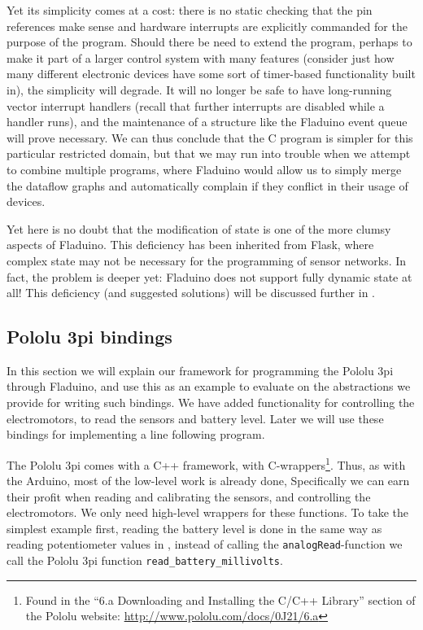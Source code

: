 \documentclass[a4paper, oneside, final]{memoir}
\let\fref\undefined
\let\Fref\undefined
\begin{document}
Yet its simplicity comes at a cost: there is no static checking that
the pin references make sense and hardware interrupts are explicitly
commanded for the purpose of the program.  Should there be need to
extend the program, perhaps to make it part of a larger control system
with many features (consider just how many different electronic
devices have some sort of timer-based functionality built in), the
simplicity will degrade.  It will no longer be safe to have
long-running vector interrupt handlers (recall that further interrupts
are disabled while a handler runs), and the maintenance of a structure
like the Fladuino event queue will prove necessary.  We can thus
conclude that the C program is simpler for this particular restricted
domain, but that we may run into trouble when we attempt to combine
multiple programs, where Fladuino would allow us to simply merge the
dataflow graphs and automatically complain if they conflict in their
usage of devices.

Yet here is no doubt that the modification of state is one of the more
clumsy aspects of Fladuino.  This deficiency has been inherited from
Flask, where complex state may not be necessary for the programming of
sensor networks.  In fact, the problem is deeper yet: Fladuino does
not support fully dynamic state at all!  This deficiency (and
suggested solutions) will be discussed further in
\Fref{chap:futurework}.

\subsection{Pololu 3pi bindings}
\label{sec:3pi bindings}
In this section we will explain our framework for programming the
Pololu 3pi through Fladuino, and use this as an example to evaluate on
the abstractions we provide for writing such bindings. We have added
functionality for controlling the electromotors, to read the sensors
and battery level. Later we will use these bindings for implementing a
line following program.

The Pololu 3pi comes with a C++ framework, with
C-wrappers\footnote{Found in the ``6.a Downloading and Installing the
  C/C++ Library'' section of the Pololu website:
  \url{http://www.pololu.com/docs/0J21/6.a}}. Thus, as with the
Arduino, most of the low-level work is already done, Specifically we
can earn their profit when reading and calibrating the sensors, and
controlling the electromotors. We only need high-level wrappers for
these functions.  To take the simplest example first, reading the
battery level is done in the same way as reading potentiometer values in
\fref[plain]{sec:potentiometer device}, instead of calling the
\verb|analogRead|-function we call the Pololu 3pi function
\verb|read_battery_millivolts|.
\end{document}
